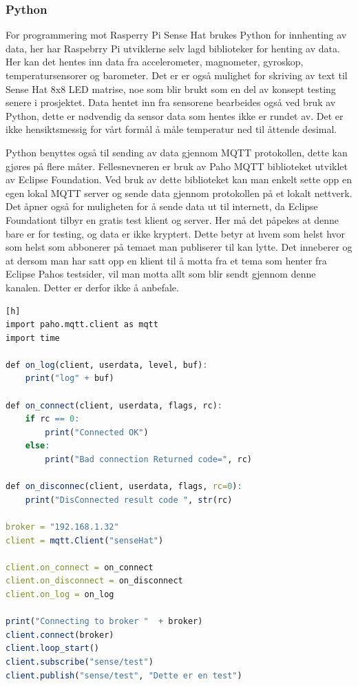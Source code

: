 \documentclass{article}
\begin{document}
\subsubsection{Python}
For programmering mot Rasperry Pi Sense Hat brukes Python for innhenting av data, her har Raspebrry Pi utviklerne selv lagd biblioteker for henting av data. Her kan det hentes inn data fra accelerometer, magnometer, gyroskop, temperatursensorer og barometer. Det er er også mulighet for skriving av text til Sense Hat 8x8 LED matrise, noe som blir brukt som en del av konsept testing senere i prosjektet. Data hentet inn fra sensorene bearbeides også ved bruk av Python, dette er nødvendig da sensor data som hentes ikke er rundet av. Det er ikke hensiktsmessig for vårt formål å måle temperatur ned til åttende desimal. 

Python benyttes også til sending av data gjennom MQTT protokollen, dette kan gjøres på flere måter. Fellesnevneren er bruk av Paho MQTT biblioteket utviklet av Eclipse Foundation. Ved bruk av dette biblioteket kan man enkelt sette opp en egen lokal MQTT server og sende  data gjennom protokollen på et lokalt nettverk. Det åpner også for muligheten for å sende data ut til internett, da Eclipse Foundationt tilbyr en gratis test klient og server. Her må det påpekes at denne bare er for testing, og data er ikke kryptert. Dette betyr at hvem som helst hvor som helst som abbonerer på temaet man publiserer til kan lytte. Det inneberer og at dersom man har satt opp en klient til å motta fra et tema som henter fra Eclipse Pahos testsider, vil man motta allt som blir sendt gjennom denne kanalen. Detter er derfor ikke å anbefale. 

\begin{lstlisting}[language=R, caption=Sending av tekst ved bruk av Paho MQTT på et lokalt nettverk][h]
import paho.mqtt.client as mqtt
import time

def on_log(client, userdata, level, buf):
	print("log" + buf)

def on_connect(client, userdata, flags, rc):
	if rc == 0:
		print("Connected OK")
	else:
		print("Bad connection Returned code=", rc)

def on_disconnec(client, userdata, flags, rc=0):
	print("DisConnected result code ", str(rc)

broker = "192.168.1.32"
client = mqtt.Client("senseHat")

client.on_connect = on_connect
client.on_disconnect = on_disconnect
client.on_log = on_log

print("Connecting to broker "  + broker)
client.connect(broker)
client.loop_start()
client.subscribe("sense/test")
client.publish("sense/test", "Dette er en test")
\end{lstlisting}
\end{document}

